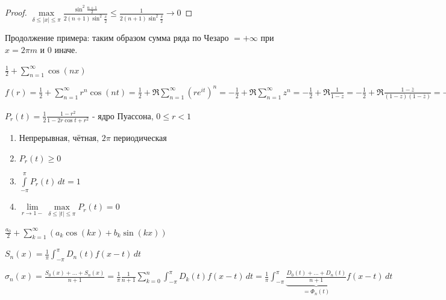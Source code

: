 \begin{example}
\begin{properties}
\begin{enumerate}
{                \begin{proof}
                    $\max\limits_{\delta \leqslant |x| \leqslant \pi} \frac{\sin^2 \frac{n + 1}{2}}{2 (n+1) \sin^2 \frac{x}{2}} \leqslant \frac{1}{2(n+1)\sin^2 \frac{\delta}{2}} \rightarrow 0$
                \end{proof}
            }
        \end{enumerate}
    \end{properties}

    Продолжение примера: таким образом сумма ряда по Чезаро $= +\infty$ при $x = 2\pi m$ и $0$ иначе.
\end{example}

\begin{example}
    $\frac{1}{2} + \sum\limits_{n=1}^\infty \cos (nx)$

    $f(r) = \frac{1}{2} + \sum\limits_{n=1}^\infty r^n \cos (nt) = \frac{1}{2} + \Re \sum\limits_{n=1}^\infty (re^{it})^n = -\frac{1}{2} + \Re \sum\limits_{n=1}^\infty z^n = - \frac{1}{2} + \Re \frac{1}{1 - z} = - \frac{1}{2} + \Re \frac{1 - \bar{z}}{(1 - z)(1 - \bar{z})} = -\frac{1}{2} + \frac{1 - \Re z}{1 + |z|^2 - 2\Re z} = 
    - \frac{1}{2} + \frac{1 - r\cos t}{1 - 2r \cos t + r^2} = \frac{1 - r^2}{2(1 - 2r \cos t + r^2)}$
\end{example}

\begin{definition}
    $P_r (t) = \frac{1}{2} \frac{1 - r^2}{1 - 2r \cos t + r^2}$ - ядро Пуассона, $0 \leqslant r < 1$
\end{definition}

\begin{properties}
    \begin{enumerate}
        \item Непрерывная, чётная, $2\pi$ периодическая
        \item {
            $P_r (t) \geqslant 0$
        }
        \item {
            $\int\limits_{-\pi}^\pi P_r (t) \, dt = 1$
        }
        \item {
            $\lim\limits_{r \to 1-} \max\limits_{\delta \leqslant |t| \leqslant \pi} P_r (t) = 0$
        }
    \end{enumerate}
    
\end{properties}

\begin{example}
    $\frac{a_0}{2} + \sum\limits_{k = 1}^\infty (a_k \cos (kx) + b_k \sin (kx))$

    $S_n (x) = \frac{1}{\pi} \int_{-\pi}^\pi D_n (t) f(x - t) \, dt$

    $\sigma_n (x) = \frac{S_0 (x) + \ldots + S_n (x)}{n + 1} = \frac{1}{\pi} \frac{1}{n+1} \sum\limits_{k = 0}^n \int_{-\pi}^\pi D_k (t) f(x - t) \, dt = \frac{1}{\pi} \int_{-\pi}^\pi \underbrace{\frac{D_0 (t) + \ldots + D_n (t)}{n + 1}}_{=\Phi_n (t)} f(x - t) \, dt $
\end{example}

